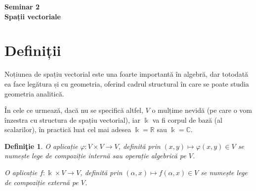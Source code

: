\documentclass[11pt,a4paper]{article}
\theoremstyle{dotless}
\theoremstyle{dotlessdr}
\newtheorem{definition}{Defini\c{t}ie}[section]
\begin{document}
\begin{center}
  {\large\textbf{Seminar 2 \\ Spații vectoriale}}
\end{center}

\vspace{1cm}


\section{Definiții}

\indent\indent Noțiunea de spațiu vectorial este una foarte importantă în 
algebră, dar totodată ea face legătura și cu geometria, oferind cadrul 
structural în care se poate studia geometria analitică.

În cele ce urmează, dacă nu se specifică altfel, $V$ o mulțime nevidă 
(pe care o vom înzestra cu structura de spațiu vectorial), iar $\Bbbk$ va fi 
corpul de bază (al scalarilor), în practică luat cel mai adesea 
$\Bbbk = \mathbb{R}$ sau $\Bbbk = \mathbb{C}$.

\begin{definition}
O aplicație $\varphi : V \times V \to V$, definită prin 
$(x, y) \mapsto \varphi(x, y) \in V$ se numește \emph{lege de compoziție 
internă} sau \emph{operație algebrică} pe $V$.

O aplicație $f : \Bbbk \times V \to V$, definită prin $(\alpha, x) \mapsto 
f(\alpha, x) \in V$ se numește \emph{lege de compoziție externă} pe $V$.
\end{definition}
\end{document}

